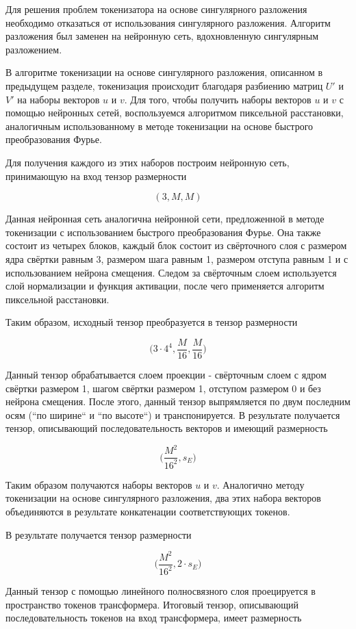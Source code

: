 \documentclass[times,specification,annotation]{itmo-student-thesis}
\begin{document}
Для решения проблем токенизатора на основе сингулярного разложения необходимо отказаться от использования сингулярного разложения. Алгоритм разложения был заменен на нейронную сеть, вдохновленную сингулярным разложением.

В алгоритме токенизации на основе сингулярного разложения, описанном в предыдущем разделе, токенизация происходит благодаря разбиению матриц $U'$ и $V'$ на наборы векторов $u$ и $v$. Для того, чтобы получить наборы векторов $u$ и $v$ с помощью нейронных сетей, воспользуемся алгоритмом пиксельной расстановки, аналогичным использованному в методе токенизации на основе быстрого преобразования Фурье. 

Для получения каждого из этих наборов построим нейронную сеть, принимающую на вход тензор размерности 

$$
(3, M, M)
$$

Данная нейронная сеть аналогична нейронной сети, предложенной в методе токенизации с использованием быстрого преобразования Фурье. Она также состоит из четырех блоков, каждый блок состоит из свёрточного слоя с размером ядра свёртки равным 3, размером шага равным 1, размером отступа равным 1 и с использованием нейрона смещения. Следом за свёрточным слоем используется слой нормализации и функция активации, после чего применяется алгоритм пиксельной расстановки. 

Таким образом, исходный тензор преобразуется в тензор размерности

$$
\Big(3 \cdot 4^4, \dfrac{M}{16}, \dfrac{M}{16}\Big)
$$

Данный тензор обрабатывается слоем проекции - свёрточным слоем с ядром свёртки размером 1, шагом свёртки размером 1, отступом размером 0 и без нейрона смещения. После этого, данный тензор выпрямляется по двум последним осям (``по ширине`` и ``по высоте``) и транспонируется. В результате получается тензор, описывающий последовательность векторов и имеющий размерность

$$
\Big(\dfrac{M^2}{16^2}, s_E\Big)
$$

Таким образом получаются наборы векторов $u$ и $v$. Аналогично методу токенизации на основе сингулярного разложения, два этих набора векторов объединяются в результате конкатенации соответствующих токенов. 

В результате получается тензор размерности

$$
\Big(\dfrac{M^2}{16^2}, 2 \cdot s_E\Big)
$$

Данный тензор с помощью линейного полносвязного слоя проецируется в пространство токенов трансформера. Итоговый тензор, описывающий последовательность токенов на вход трансформера, имеет размерность
\end{document}
